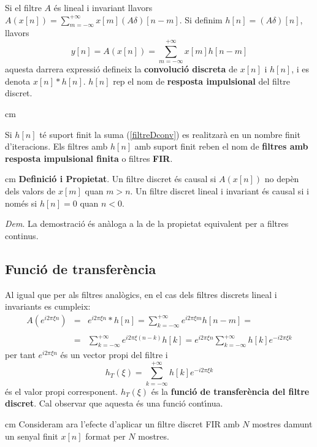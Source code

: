 \documentclass{article}
\begin{document}
Si el filtre $A$ \'es lineal i invariant llavors
$
A(x[n])=\sum_{m=-\infty}^{+\infty} x[m] (A\delta)[n-m]
$.
Si definim $h[n]=(A\delta)[n]$, llavors 
\begin{equation}
\label{filtreDconv}
y[n]=A(x[n])=\sum_{m=-\infty}^{+\infty} x[m] h[n-m]
\end{equation}
\noindent
aquesta darrera expressi\'o defineix la {\bf convoluci\'o discreta} de $x[n]$ i $h[n]$,
i es denota $x[n]*h[n]$. $h[n]$ rep el nom de {\bf resposta impulsional} del filtre discret.

 cm

Si $h[n]$ t\'e suport finit la suma (\ref{filtreDconv}) es realitzar\`a en un nombre
finit d'iteracions. Els  filtres amb $h[n]$ amb suport finit reben el nom de {\bf filtres 
amb resposta impulsional finita} o filtres {\bf FIR}.

 cm
\noindent
{\bf Definici\'o i Propietat}. Un filtre discret \'es causal si $A(x[n])$ no dep\`en dels 
valors de $x[m]$ quan $m > n$. Un filtre discret lineal i invariant \'es causal si i
nom\'es si $h[n]=0$ quan $n < 0$.

\noindent
{\it Dem}. La demostraci\'o \'es an\`aloga a la de la propietat equivalent per a filtres
continus.

\subsection{Funci\'o de transfer\`encia}
Al igual que per als filtres anal\`ogics, en el cas dels filtres discrets lineal i 
in\-va\-riants es cumpleix:
\[
\begin{array}{rcl}
A(e^{i 2 \pi \xi n}) & = & e^{i 2 \pi \xi n} * h[n] = 
                           \sum_{k=-\infty}^{+\infty} e^{i 2 \pi \xi m} h[n-m] =\\ \\
                     & = & \sum_{k=-\infty}^{+\infty} e^{i 2 \pi \xi (n-k)} h[k] =
                           e^{i 2 \pi \xi n} \sum_{k=-\infty}^{+\infty} h[k] e^{-i 2 \pi \xi k} 
\end{array}
\]
per tant $e^{i 2 \pi \xi n}$ \'es un vector propi del filtre i 
\[ 
h_T(\xi)=\sum_{k=-\infty}^{+\infty} h[k] e^{-i 2 \pi \xi k}
\]
\noindent
\'es el valor propi corresponent.
$h_T(\xi)$ \'es la {\bf funci\'o de transfer\`encia del filtre discret}. Cal observar
que aquesta \'es una funci\'o cont\'\i nua.

 cm
Consideram ara l'efecte d'aplicar un filtre discret FIR amb $N$ mostres 
damunt un senyal finit $x[n]$ format per $N$ mostres.
\end{document}
